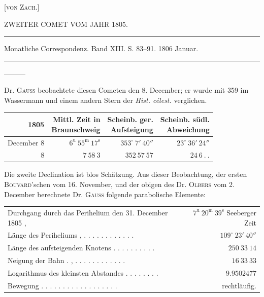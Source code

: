 \hfill[\textsc{von Zach.}]

\begin{center}
ZWEITER COMET VOM JAHR 1805.

\rule{0.6\linewidth}{0.4pt}

Monatliche Correspondenz. Band XIII. S. 83–91. 1806 Januar.

\rule{0.6\linewidth}{0.4pt}

—\quad—\quad—
\end{center}

Dr. \textsc{Gauss} beobachtete diesen Cometen den 8. December; er wurde mit 359 im Wassermann und einem andern Stern der \emph{Hist. célest.} verglichen.

\begin{center}
\begingroup\fontsize{9}{11}\selectfont\setlength{\tabcolsep}{3pt}\renewcommand{\arraystretch}{1.1}
\begin{tabular}{r|r|r|r}
1805 & \shortstack{Mittl. Zeit in\\Braunschweig} & \shortstack{Scheinb. ger.\\Aufsteigung} & \shortstack{Scheinb. südl.\\Abweichung}\\ \hline
December 8 & $6^{\mathrm u}\ 55^{\mathrm m}\ 17^{\mathrm s}$ & $353^\circ\ 7'\ 40''$ & $23^\circ\ 36'\ 24''$ \\
8 & $7\ 58\ 3$ & $352\ 57\ 57$ & $24\ 6\ .\ .$ \\
\end{tabular}\endgroup
\end{center}

\par\indent Die zweite Declination ist blos Schätzung. Aus dieser Beobachtung, der ersten \textsc{Bouvard}'schen vom 16. November, und der obigen des Dr. \textsc{Olbers} vom 2. December berechnete Dr. \textsc{Gauss} folgende parabolische Elemente:

\begin{center}
\begingroup\fontsize{8}{10}\selectfont\setlength{\tabcolsep}{3pt}\renewcommand{\arraystretch}{1.1}
\begin{tabular}{lr}
Durchgang durch das Perihelium den 31. December 1805 , & $7^{\mathrm u}\ 20^{\mathrm m}\ 39^{\mathrm s}$ Seeberger Zeit \\
Länge des Periheliums , . . . . . . . . . . . . & $109^\circ\ 23'\ 40''$ \\
Länge des aufsteigenden Knotens . . . . . . . . . . & $250\ 33\ 14$ \\
Neigung der Bahn . , . . . . . \raisebox{.3ex}{.} . . . . . . . & $16\ 33\ 33$ \\
Logarithmus des kleinsten Abstandes . . . . . . . . & $9.9502477$ \\
Bewegung . . . . . . . . . . . . . . . . . . & rechtläufig. \\
\end{tabular}\endgroup
\end{center}

